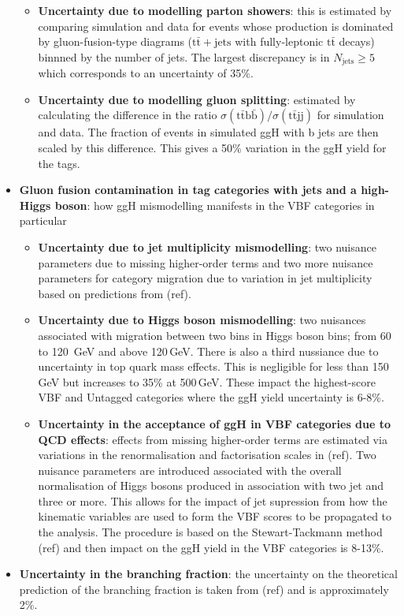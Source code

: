 \begin{itemize}[noitemsep]
{\begin{itemize}[noitemsep]
            \item[\textbullet] \textbf{Uncertainty due to modelling parton showers}: this is estimated by comparing simulation and data for events whose production is dominated by gluon-fusion-type diagrams ($\mathrm{t}\bar{\mathrm{t}}+\mathrm{jets}$ with fully-leptonic $\mathrm{t}\bar{\mathrm{t}}$ decays) binnned by the number of jets. The largest discrepancy is in $N_{\mathrm{jets}}\geq{5}$ which corresponds to an uncertainty of 35\%.
            \item[\textbullet] \textbf{Uncertainty due to modelling gluon splitting}: estimated by calculating the difference in the ratio $\sigma(\mathrm{t\bar{t}b\bar{b}})/\sigma(\mathrm{t\bar{t}jj})$ for simulation and data. The fraction of events in simulated ggH with b jets are then scaled by this difference. This gives a 50\% variation in the ggH yield for the \ttH tags. 
        \end{itemize}}
    \item{\textbf{Gluon fusion contamination in tag categories with jets and a high-\pt Higgs boson}: how ggH mismodelling manifests in the VBF categories in particular 
        \begin{itemize}[noitemsep]
            \item[\textbullet] \textbf{Uncertainty due to jet multiplicity mismodelling}: two nuisance parameters due to missing higher-order terms and two more nuisance parameters for category migration due to variation in jet multiplicity based on predictions from (ref).
            \item[\textbullet] \textbf{Uncertainty due to Higgs boson \pt mismodelling}: two nuisances associated with migration between two bins in Higgs boson \pt bins; from 60 to 120 \,GeV and above 120\,GeV. There is also a third nussiance due to uncertainty in top quark mass effects. This is negligible for \pt less than 150\,GeV but increases to 35\% at 500\,GeV. These impact the highest-score VBF and Untagged categories where the ggH yield uncertainty is 6-8\%.
            \item[\textbullet] \textbf{Uncertainty in the acceptance of ggH in VBF categories due to QCD effects}: effects from missing higher-order terms are estimated via variations in the renormalisation and factorisation scales in (ref). Two nuisance parameters are introduced associated with the overall normalisation of Higgs bosons produced in association with two jet and three or more. This allows for the impact of jet supression from how the kinematic variables are used to form the VBF scores to be propagated to the analysis. The procedure is based on the Stewart-Tackmann method (ref) and then impact on the ggH yield in the VBF categories is 8-13\%. 
        \end{itemize}}
    \item{\textbf{Uncertainty in the \Hgg branching fraction}: the uncertainty on the theoretical prediction of the \Hgg branching fraction is taken from (ref) and is approximately 2\%.}
\end{itemize}

